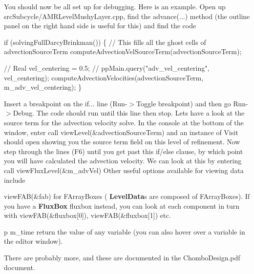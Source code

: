 You should now be all set up for debugging. Here is an example. Open up {\ttfamily src\+Subcycle/\+A\+M\+R\+Level\+Mushy\+Layer.\+cpp}, find the {\ttfamily advance(...)} method (the outline panel on the right hand side is useful for this) and find the code 
\begin{DoxyCode}
if (solvingFullDarcyBrinkman())
  \{
    // This fills all the ghost cells of advectionSourceTerm
    computeAdvectionVelSourceTerm(advectionSourceTerm);

    //    Real vel\_centering = 0.5;
    //    ppMain.query("adv\_vel\_centering", vel\_centering);
    computeAdvectionVelocities(advectionSourceTerm, m\_adv\_vel\_centering);
  \}
\end{DoxyCode}
 Insert a breakpoint on the {\ttfamily if...} line (Run-\/$>$Toggle breakpoint) and then go Run-\/$>$Debug. The code should run until this line then stop. Let\textquotesingle{}s have a look at the source term for the advection velocity solve. In the console at the bottom of the window, enter {\ttfamily call view\+Level(\&advection\+Source\+Term)} and an instance of Visit should open showing you the source term field on this level of refinement. Now step through the lines (F6) until you get past this {\ttfamily if/else} clause, by which point you will have calculated the advection velocity. We can look at this by entering {\ttfamily call view\+Flux\+Level(\&m\+\_\+adv\+Vel)} Other useful options available for viewing data include


\begin{DoxyItemize}
\item {\ttfamily view\+F\+A\+B(\&fab)} for F\+Array\+Boxes (\textbf{ Level\+Data}\textquotesingle{}s are composed of F\+Array\+Boxes). If you have a \textbf{ Flux\+Box} {\ttfamily fluxbox} instead, you can look at each component in turn with {\ttfamily view\+F\+A\+B(\&fluxbox\mbox{[}0\mbox{]})}, {\ttfamily view\+F\+A\+B(\&fluxbox\mbox{[}1\mbox{]})} etc.
\item {\ttfamily p m\+\_\+time} return the value of any variable (you can also hover over a variable in the editor window).
\end{DoxyItemize}

There are probably more, and these are documented in the Chombo\+Design.\+pdf document. 